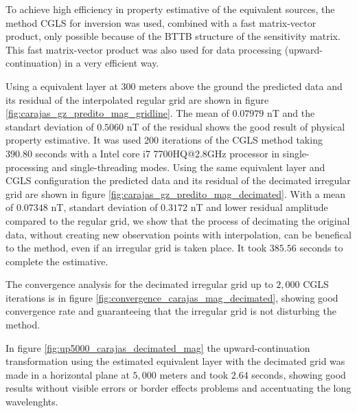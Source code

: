 To achieve high efficiency in property estimative of the equivalent sources, the method CGLS for inversion was used, combined with a fast matrix-vector product, only possible because of the BTTB structure of the sensitivity matrix. This fast matrix-vector product was also used for data processing (upward-continuation) in a very efficient way.

Using a equivalent layer at $300$ meters above the ground the predicted data and its residual of the interpolated regular grid are shown in figure \ref{fig:carajas_gz_predito_mag_gridline}. The mean of $0.07979$ nT and the standart deviation of $0.5060$ nT of the residual shows the good result of physical property estimative. It was used 200 iterations of the CGLS method taking $390.80$ seconds with a Intel core i7 7700HQ@2.8GHz processor in single-processing and single-threading modes. Using the same equivalent layer and CGLS configuration the predicted data and its residual of the decimated irregular grid are shown in figure \ref{fig:carajas_gz_predito_mag_decimated}.
With a mean of $0.07348$ nT, standart deviation of $0.3172$ nT and lower residual amplitude compared to the regular grid, we show that the process of decimating the original data, without creating new observation points with interpolation, can be benefical to the method, even if an irregular grid is taken place. It took $385.56$ seconds to complete the estimative.

The convergence analysis for the decimated irregular grid up to $2,000$ CGLS iterations is in figure \ref{fig:convergence_carajas_mag_decimated}, showing good convergence rate and guaranteeing that the irregular grid is not disturbing the method.

In figure \ref{fig:up5000_carajas_decimated_mag} the upward-continuation transformation using the estimated equivalent layer with the decimated grid was made in a horizontal plane at $5,000$ meters and took $2.64$ seconds, showing good results without visible errors or border effects problems and accentuating the long wavelenghts.